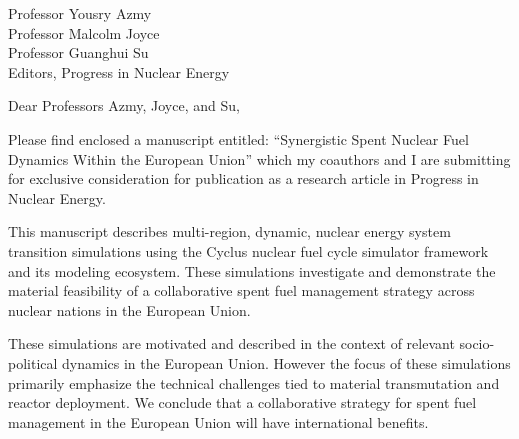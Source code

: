 \documentclass[11pt]{letter} %
\begin{document}


\begin{letter}{Professor Yousry Azmy\\
Professor Malcolm Joyce\\
Professor Guanghui Su\\
Editors, Progress in Nuclear Energy}


\address{Kathryn D. Huff\\
118 Talbot Laboratory\\
MC-234\\
104 S. Wright Street\\
Urbana, IL 61801}



\opening{Dear Professors Azmy, Joyce, and Su,}

Please find enclosed a manuscript entitled: ``Synergistic Spent Nuclear Fuel Dynamics Within the European Union'' which my coauthors and I are submitting for exclusive 
consideration for publication as a research article in Progress in Nuclear Energy.

This manuscript describes multi-region, dynamic, nuclear energy system transition simulations using the Cyclus nuclear fuel cycle simulator framework and its modeling ecosystem. These simulations investigate and demonstrate the material feasibility of a collaborative spent fuel management strategy across nuclear nations in the European Union.  

These simulations are motivated and described in the context of relevant
socio-political dynamics in the European Union. However the focus of these
simulations primarily emphasize the technical challenges tied to material transmutation
and reactor deployment. We conclude that a collaborative strategy for spent fuel management in the European Union will have international benefits.


\end{letter}
\end{document}

